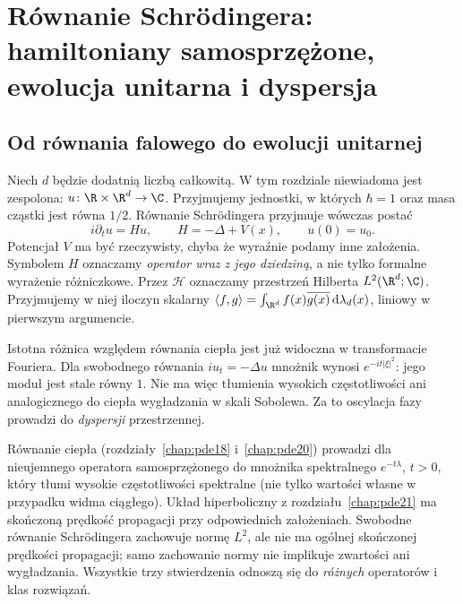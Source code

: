 \chapter[Równanie Schrödingera]{Równanie Schrödingera: hamiltoniany samosprzężone, ewolucja unitarna i dyspersja}
\label{chap:pde22}

\section{Od równania falowego do ewolucji unitarnej}
Niech $d$ będzie dodatnią liczbą całkowitą. W tym
rozdziale niewiadoma jest zespolona:
$u\colon\R\times\R^d\to\C$. Przyjmujemy jednostki, w których
$\hbar=1$ oraz masa cząstki jest równa $1/2$. Równanie
Schrödingera przyjmuje wówczas postać
\begin{equation}\label{eq:pde22-schrod}
 i\partial_tu=Hu,\qquad H=-\Delta+V(x),\qquad u(0)=u_0.
\end{equation}
Potencjał $V$ ma być rzeczywisty, chyba że wyraźnie podamy inne
założenia. Symbolem $H$ oznaczamy \emph{operator wraz z jego
dziedziną}, a nie tylko formalne wyrażenie różniczkowe.
Przez $\mathcal H$ oznaczamy przestrzeń Hilberta
$L^2(\R^d;\C)$. Przyjmujemy w niej iloczyn skalarny
$\langle f,g\rangle=\int_{\R^d}f(x)\overline{g(x)}\,\mathrm d\lambda_d(x)$,
liniowy w pierwszym argumencie.

Istotna różnica względem równania ciepła jest już widoczna w
transformacie Fouriera. Dla swobodnego równania $i u_t=-\Delta u$
mnożnik wynosi $e^{-it|\xi|^2}$: jego moduł jest stale równy $1$.
Nie ma więc tłumienia wysokich częstotliwości ani analogicznego
do ciepła wygładzania w skali Sobolewa. Za to oscylacja fazy
prowadzi do \emph{dyspersji} przestrzennej.

\begin{uwaga}
\label{rem:pde-v43-evolution-contrast}
Równanie ciepła (rozdziały~\ref{chap:pde18} i~\ref{chap:pde20})
prowadzi dla nieujemnego operatora samosprzężonego
do mnożnika spektralnego $e^{-t\lambda}$, $t>0$,
który tłumi wysokie częstotliwości spektralne
(nie tylko wartości własne w przypadku widma ciągłego). Układ hiperboliczny z rozdziału~\ref{chap:pde21}
ma skończoną prędkość propagacji przy odpowiednich
założeniach. Swobodne równanie Schrödingera zachowuje
normę $L^2$, ale nie ma ogólnej skończonej prędkości
propagacji; samo zachowanie normy nie implikuje
zwartości ani wygładzania. Wszystkie trzy stwierdzenia
odnoszą się do \emph{różnych} operatorów i klas rozwiązań.
\end{uwaga}

